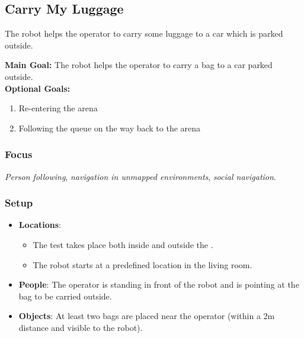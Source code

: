 \subsection{Carry My Luggage}
\label{test:carry-my-luggage}
The robot helps the operator to carry some luggage to a car which is parked outside.

\noindent \textbf{Main Goal:} The robot helps the operator to carry a bag to a car parked outside.\\

\noindent \textbf{Optional Goals:}
\begin{enumerate}[nosep]
	\item Re-entering the arena
	\item Following the queue on the way back to the arena
\end{enumerate}

\subsubsection*{Focus}
\emph{Person following}, \emph{navigation in unmapped environments}, \emph{social navigation}.

\subsubsection*{Setup}
\begin{itemize}[nosep]
	\item \textbf{Locations}: 
		\begin{itemize}
		 \item The test takes place both inside and outside the \Arena{}.
		 \item The robot starts at a predefined location in the living room.
		\end{itemize}
	\item \textbf{People}: The operator is standing in front of the robot and is pointing at the bag to be carried outside.
	\item \textbf{Objects}: At least two bags are placed near the operator (within a 2m distance and visible to the robot).
\end{itemize}

